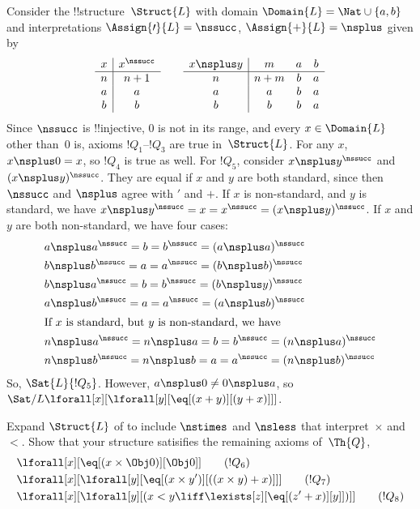\documentclass[../../../include/open-logic-section]{subfiles}
\begin{document}
\begin{ex}
 Consider the !!{structure}~$\Struct{L}$ with
domain $\Domain{L} = \Nat \cup \{a, b\}$ and interpretations
$\Assign{\prime}{L} = \nssucc$, $\Assign{+}{L} = \nsplus$ given by
\[
\begin{array}{c|c}
  x & x^\nssucc \\
  \hline
  n & n+1 \\
  a & a\\
  b & b
\end{array}
\qquad
\begin{array}{c|ccc}
  x \nsplus y & m & a & b\\
  \hline
  n & n+m & b & a\\
  a & a & b & a\\
  b & b & b & a
\end{array}
\]
Since $\nssucc$ is !!{injective}, $0$ is not in its range, and every
$x \in \Domain{L}$ other than~$0$ is, axioms $!Q_1$--$!Q_3$ are true
in~$\Struct{L}$. For any $x$, $x \nsplus 0 = x$, so $!Q_4$ is true as
well.  For $!Q_5$, consider $x \nsplus y^\nssucc$ and $(x \nsplus
y)^\nssucc$. They are equal if $x$ and $y$ are both standard, since
then $\nssucc$ and $\nsplus$ agree with $\prime$ and $+$. If $x$ is
non-standard, and $y$ is standard, we have $x \nsplus y^\nssucc = x =
x^\nssucc = (x \nsplus y)^\nssucc$. If $x$ and $y$ are both
non-standard, we have four cases:
\begin{align*}
&  a \nsplus a^\nssucc  = b = b^\nssucc = (a \nsplus a)^\nssucc\\
&  b \nsplus b^\nssucc  = a = a^\nssucc = (b \nsplus b)^\nssucc\\
&  b \nsplus a^\nssucc  = b = b^\nssucc = (b \nsplus y)^\nssucc\\
&  a \nsplus b^\nssucc  = a = a^\nssucc = (a \nsplus b)^\nssucc\\
\intertext{If $x$ is standard, but $y$ is non-standard, we have}
&  n \nsplus a^\nssucc  = n \nsplus a = b = b^\nssucc = (n \nsplus a)^\nssucc\\
&  n \nsplus b^\nssucc  = n \nsplus b = a = a^\nssucc = (n \nsplus b)^\nssucc
\end{align*}
So, $\Sat{L}{!Q_5}$. However, $a \nsplus 0 \neq 0 \nsplus a$, so
$\Sat/{L}{\lforall[x][\lforall[y][\eq[(x+y)][(y+x)]]]}$.
\end{ex}

\begin{prob}
Expand $\Struct{L}$ of  to
include $\nstimes$ and $\nsless$ that interpret~$\times$ and $<$. Show
that your structure satisifies the remaining axioms of~$\Th{Q}$,
\begin{align*}
& \lforall[x][\eq[(x \times \Obj 0)][\Obj 0]] \tag{$!Q_6$}\\ &
  \lforall[x][\lforall[y][\eq[(x \times y')][((x \times y) + x)]]]
  \tag{$!Q_7$}\\ & \lforall[x][\lforall[y][(x < y \liff \lexists[z][\eq[(z'+x)][y]])]] \tag{$!Q_8$}
\end{align*}
\end{prob}
\end{document}
